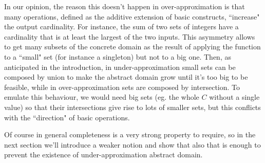 In our opinion, the reason this doesn't happen in over-approximation is that many operations, defined as the additive extension of basic constructs, ``increase" the output cardinality. For instance, the sum of two sets of integers have a cardinality that is at least the largest of the two inputs. This asymmetry allows to get many subsets of the concrete domain as the result of applying the function to a ``small" set (for instance a singleton) but not to a big one.
Then, as anticipated in the introduction, in under-approximation small sets can be composed by union to make the abstract domain grow until it's too big to be feasible, while in over-approximation sets are composed by intersection. To emulate this behaviour, we would need big sets (eg. the whole $C$ without a single value) so that their intersections give rise to lots of smaller sets, but this conflicts with the ``direction" of basic operations.

Of course in general completeness is a very strong property to require, so in the next section we'll introduce a weaker notion and show that also that is enough to prevent the existence of under-approximation abstract domain.

